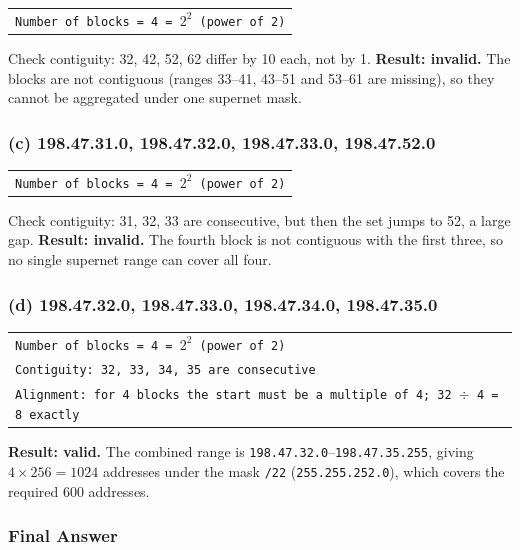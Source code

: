 \documentclass[11pt,a4paper]{article}
\begin{document}
\begin{tabularx}{\textwidth}{@{}X@{}}
\texttt{Number of blocks = 4 = $2^{2}$ (power of 2)} \\
\end{tabularx}

Check contiguity: 32, 42, 52, 62 differ by 10 each, not by 1.
\textbf{Result: invalid.} The blocks are not contiguous (ranges 33--41, 43--51
and 53--61 are missing), so they cannot be aggregated under one supernet mask.

\subsubsection*{(c) 198.47.31.0, 198.47.32.0, 198.47.33.0, 198.47.52.0}

\begin{tabularx}{\textwidth}{@{}X@{}}
\texttt{Number of blocks = 4 = $2^{2}$ (power of 2)} \\
\end{tabularx}

Check contiguity: 31, 32, 33 are consecutive, but then the set jumps to 52, a
large gap. \textbf{Result: invalid.} The fourth block is not contiguous with
the first three, so no single supernet range can cover all four.

\subsubsection*{(d) 198.47.32.0, 198.47.33.0, 198.47.34.0, 198.47.35.0}

\begin{tabularx}{\textwidth}{@{}X@{}}
\texttt{Number of blocks = 4 = $2^{2}$ (power of 2)} \\
\texttt{Contiguity: 32, 33, 34, 35 are consecutive} \\
\texttt{Alignment: for 4 blocks the start must be a multiple of 4; 32 $\div$ 4 = 8 exactly} \\
\end{tabularx}

\textbf{Result: valid.} The combined range is
\texttt{198.47.32.0}--\texttt{198.47.35.255}, giving $4 \times 256 = 1024$
addresses under the mask \texttt{/22} (\texttt{255.255.252.0}), which covers the
required 600 addresses.

\subsubsection*{Final Answer}
\end{document}
